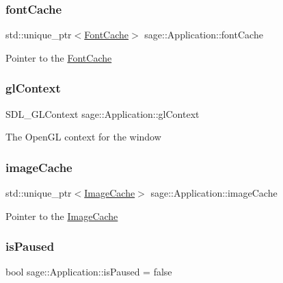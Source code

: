 \subsubsection{\texorpdfstring{fontCache}{fontCache}}
{\footnotesize\ttfamily std\+::unique\+\_\+ptr$<$\mbox{\hyperlink{classsage_1_1FontCache}{Font\+Cache}}$>$ sage\+::\+Application\+::font\+Cache\hspace{0.3cm}{\ttfamily [private]}}

Pointer to the \mbox{\hyperlink{classsage_1_1FontCache}{Font\+Cache}} \mbox{\label{classsage_1_1Application_af4b3656acba3ea7f6409885223e49dc2}} 
\subsubsection{\texorpdfstring{glContext}{glContext}}
{\footnotesize\ttfamily S\+D\+L\+\_\+\+G\+L\+Context sage\+::\+Application\+::gl\+Context\hspace{0.3cm}{\ttfamily [private]}}

The Open\+GL context for the window \mbox{\label{classsage_1_1Application_a951b28603bbc30da98db70a1757ac526}} 
\subsubsection{\texorpdfstring{imageCache}{imageCache}}
{\footnotesize\ttfamily std\+::unique\+\_\+ptr$<$\mbox{\hyperlink{classsage_1_1ImageCache}{Image\+Cache}}$>$ sage\+::\+Application\+::image\+Cache\hspace{0.3cm}{\ttfamily [private]}}

Pointer to the \mbox{\hyperlink{classsage_1_1ImageCache}{Image\+Cache}} \mbox{\label{classsage_1_1Application_a2c8135f73ec3091ffcb750dcc280c4d2}} 
\subsubsection{\texorpdfstring{isPaused}{isPaused}}
{\footnotesize\ttfamily bool sage\+::\+Application\+::is\+Paused = false\hspace{0.3cm}{\ttfamily [private]}}


